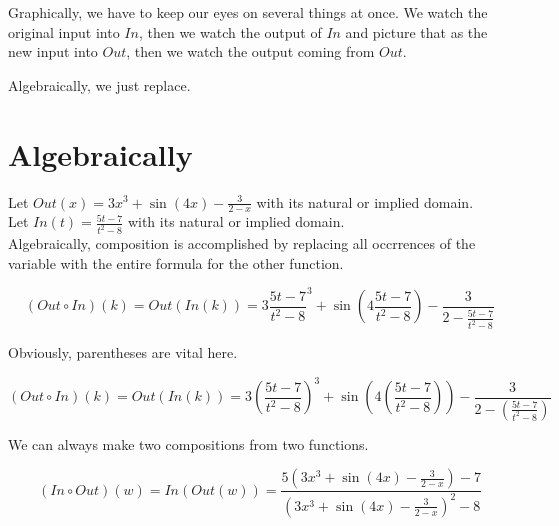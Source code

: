 \documentclass{ximera}
\begin{document}
Graphically, we have to keep our eyes on several things at once.  We watch the original input into $In$, then we watch the output of $In$ and picture that as the new input into $Out$, then we watch the output coming from $Out$.

Algebraically, we just replace.



\section{Algebraically}







Let $Out(x) = 3x^3 + \sin(4x) - \frac{3}{2-x}$ with its natural or implied domain. \\
Let $In(t) = \frac{5t-7}{t^2-8}$ with its natural or implied domain. \\



Algebraically, composition is accomplished by replacing all occrrences of the variable with the entire formula for the other function.




\[
(Out \circ In)(k) = Out(In(k)) = 3 {\frac{5t-7}{t^2-8}}^3 + \sin(4 \frac{5t-7}{t^2-8}) - \frac{3}{2-\frac{5t-7}{t^2-8}}
\]





Obviously, parentheses are vital here.





\[
(Out \circ In)(k) = Out(In(k)) = 3 \left( \frac{5t-7}{t^2-8} \right)^3 + \sin\left( 4 \left( \frac{5t-7}{t^2-8} \right) \right) - \frac{3}{2 - \left( \frac{5t-7}{t^2-8} \right)}
\]






We can always make two compositions from two functions.




\[
(In \circ Out)(w) = In(Out(w)) = \frac{5 \left( 3x^3 + \sin(4x) - \frac{3}{2-x} \right)-7}{\left( 3x^3 + \sin(4x) - \frac{3}{2-x} \right)^2-8}
\]
\end{document}
